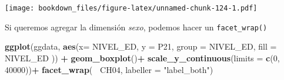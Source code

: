 \documentclass[]{book}
\newenvironment{Shaded}{\begin{snugshade}}{\end{snugshade}}
\newcommand{\CommentTok}[1]{\textcolor[rgb]{0.56,0.35,0.01}{\textit{#1}}}
\newcommand{\DataTypeTok}[1]{\textcolor[rgb]{0.13,0.29,0.53}{#1}}
\newcommand{\DecValTok}[1]{\textcolor[rgb]{0.00,0.00,0.81}{#1}}
\newcommand{\KeywordTok}[1]{\textcolor[rgb]{0.13,0.29,0.53}{\textbf{#1}}}
\newcommand{\NormalTok}[1]{#1}
\newcommand{\OperatorTok}[1]{\textcolor[rgb]{0.81,0.36,0.00}{\textbf{#1}}}
\newcommand{\StringTok}[1]{\textcolor[rgb]{0.31,0.60,0.02}{#1}}
\begin{document}
\begin{Shaded}
\end{Shaded}

\begin{Shaded}
\end{Shaded}

\texttt{[image: bookdown\_files/figure-latex/unnamed-chunk-124-1.pdf]}

Si queremos agregar la dimensión \emph{sexo}, podemos hacer un \texttt{facet\_wrap()}

\begin{Shaded}
\begin{Highlighting}[]
\KeywordTok{ggplot}\NormalTok{(ggdata, }\KeywordTok{aes}\NormalTok{(}\DataTypeTok{x=}\NormalTok{ NIVEL_ED, }\DataTypeTok{y =}\NormalTok{ P21, }\DataTypeTok{group =}\NormalTok{ NIVEL_ED, }\DataTypeTok{fill =}\NormalTok{ NIVEL_ED )) }\OperatorTok{+}
\StringTok{  }\KeywordTok{geom_boxplot}\NormalTok{()}\OperatorTok{+}
\StringTok{  }\KeywordTok{scale_y_continuous}\NormalTok{(}\DataTypeTok{limits =} \KeywordTok{c}\NormalTok{(}\DecValTok{0}\NormalTok{, }\DecValTok{40000}\NormalTok{))}\OperatorTok{+}
\StringTok{  }\KeywordTok{facet_wrap}\NormalTok{(}\OperatorTok{~}\StringTok{ }\NormalTok{CH04, }\DataTypeTok{labeller =} \StringTok{"label_both"}\NormalTok{)}
\end{Highlighting}
\end{Shaded}
\end{document}
